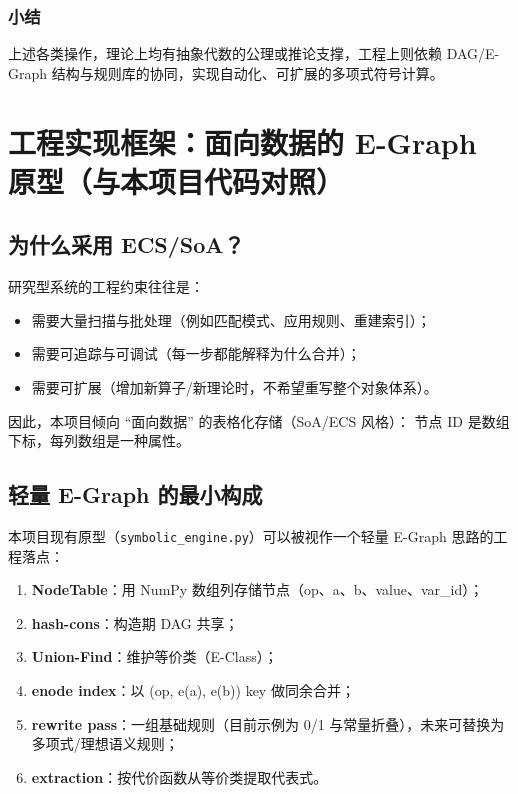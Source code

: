\documentclass[12pt,openany]{book}
\begin{document}
\subsection{小结}
上述各类操作，理论上均有抽象代数的公理或推论支撑，工程上则依赖 DAG/E-Graph 结构与规则库的协同，实现自动化、可扩展的多项式符号计算。

\chapter{工程实现框架：面向数据的 E-Graph 原型（与本项目代码对照）}

\section{为什么采用 ECS/SoA？}

研究型系统的工程约束往往是：

\begin{itemize}
  \item 需要大量扫描与批处理（例如匹配模式、应用规则、重建索引）；
  \item 需要可追踪与可调试（每一步都能解释为什么合并）；
  \item 需要可扩展（增加新算子/新理论时，不希望重写整个对象体系）。
\end{itemize}

因此，本项目倾向 ``面向数据'' 的表格化存储（SoA/ECS 风格）：
节点 ID 是数组下标，每列数组是一种属性。

\section{轻量 E-Graph 的最小构成}

本项目现有原型（\texttt{symbolic\_engine.py}）可以被视作一个轻量 E-Graph 思路的工程落点：

\begin{enumerate}
  \item \textbf{NodeTable}：用 NumPy 数组列存储节点（op、a、b、value、var\_id）；
  \item \textbf{hash-cons}：构造期 DAG 共享；
  \item \textbf{Union-Find}：维护等价类（E-Class）；
  \item \textbf{enode index}：以 (op, e(a), e(b)) key 做同余合并；
  \item \textbf{rewrite pass}：一组基础规则（目前示例为 0/1 与常量折叠），未来可替换为多项式/理想语义规则；
  \item \textbf{extraction}：按代价函数从等价类提取代表式。
\end{enumerate}
\end{document}
